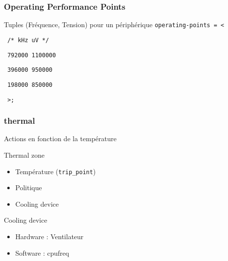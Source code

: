 \begin{frame}
	\frametitle{Operating Performance Points}
	\begin{block}{Tuples (Fréquence, Tension) pour un périphérique}
	\texttt{operating-points = <}

	\texttt{     /* kHz    uV */}

	\texttt{     792000  1100000}

	\texttt{     396000  950000}

	\texttt{     198000  850000}

	\texttt{     >;}
	\end{block}
\end{frame}
\begin{frame}
	\frametitle{thermal}
	Actions en fonction de la température
	\begin{block}{Thermal zone}
		\begin{itemize}
			\item Température (\texttt{trip\_point})
			\item Politique 
			\item Cooling device
		\end{itemize}
	\end{block}
	\begin{block}{Cooling device}
		\begin{itemize}
			\item Hardware : Ventilateur
			\item Software : cpufreq
		\end{itemize}
	\end{block}
\end{frame}


